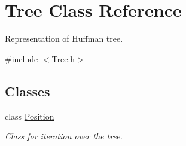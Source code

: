 \hypertarget{class_tree}{}\section{Tree Class Reference}
\label{class_tree}


Representation of Huffman tree.  




{\ttfamily \#include $<$Tree.\+h$>$}

\subsection*{Classes}
\begin{DoxyCompactItemize}
\item 
class \mbox{\hyperlink{class_tree_1_1_position}{Position}}
\begin{DoxyCompactList}\small\item\em Class for iteration over the tree. \end{DoxyCompactList}\end{DoxyCompactItemize}
